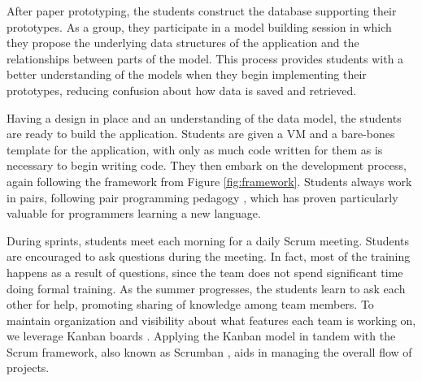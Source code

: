 After paper prototyping, the students construct the database supporting their prototypes. As a group, they participate in a model building session in which they propose the underlying data structures of the application and the relationships between parts of the model. This process provides students with a better understanding of the models when they begin implementing their prototypes, reducing confusion about how data is saved and retrieved.  %


Having a design in place and an understanding of the data model, the students are ready to build the application. Students are given a VM and a bare-bones template for the application, with only as much code written for them as is necessary to begin writing code. They then embark on the development process, again following the framework from Figure \ref{fig:framework}. Students always work in pairs, following pair programming pedagogy \cite{2002PairProgramming}, which has proven particularly valuable for programmers learning a new language. 


During sprints, students meet each morning for a daily Scrum meeting. Students are encouraged to ask questions during the meeting. In fact, most of the training happens as a result of questions, since the team does not spend significant time doing formal training. As the summer progresses, the students learn to ask each other for help, promoting sharing of knowledge among team members. To maintain organization and visibility about what features each team is working on, we leverage Kanban boards \cite{anderson2010kanban}. Applying the Kanban model in tandem with the Scrum framework, also known as Scrumban  \cite{ladas2009scrumban}, aids in managing the overall flow of projects. 



